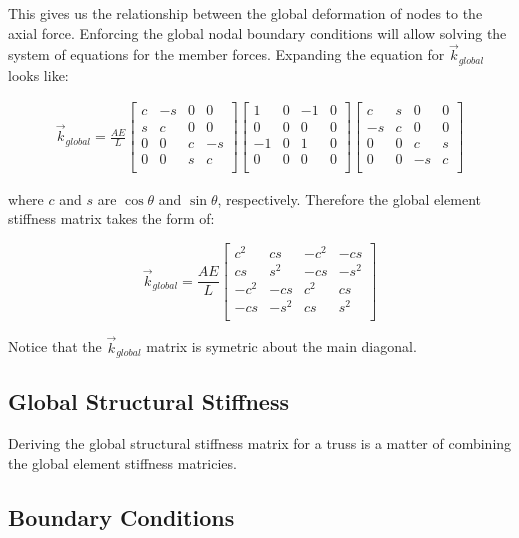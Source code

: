 This gives us the relationship between the global deformation of nodes to the axial force. Enforcing the global nodal boundary conditions will allow solving the system of equations for the member forces. Expanding the equation for $\vec{k}_{global}$ looks like:

\begin{align*}
\vec{k}_{global}
=
\frac{AE}{L}
	\begin{bmatrix}
  		c & -s & 0 & 0\\
  		s & c & 0 & 0\\
  		0 & 0 & c & -s\\
  		0 & 0 & s & c\\
	\end{bmatrix}
	\begin{bmatrix}
  		1 & 0 & -1 & 0\\
  		0 & 0 & 0 & 0\\
  		-1 & 0 & 1 & 0\\
  		0 & 0 & 0 & 0\\
	\end{bmatrix}
	\begin{bmatrix}
  		c & s & 0 & 0\\
  		-s & c & 0 & 0\\
  		0 & 0 & c & s\\
  		0 & 0 & -s & c\\
\end{bmatrix}
\end{align*}

where $c$ and $s$ are $\cos\theta$ and $\sin\theta$, respectively. Therefore the global element stiffness matrix takes the form of:

\begin{equation}
\vec{k}_{global}
=
\frac{AE}{L}
	\begin{bmatrix}
  	c^2 & cs & -c^2 & -cs\\
  	cs & s^2 & -cs & -s^2\\
  	-c^2 & -cs & c^2 & cs\\
  	-cs & -s^2 & cs & s^2\\
	\end{bmatrix}
\end{equation}

Notice that the $\vec{k}_{global}$ matrix is  symetric about the main diagonal. 

\subsection{Global Structural Stiffness}

Deriving the global structural stiffness matrix for a truss is a matter of combining the global element stiffness matricies.

\subsection{Boundary Conditions}

